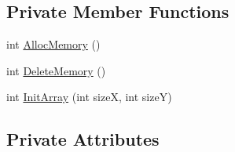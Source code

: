 \subsection*{Private Member Functions}
\begin{DoxyCompactItemize}
\item 
int \hyperlink{classCArray2d_ad7566b350c9840af12641ca9385aa352}{AllocMemory} ()
\item 
int \hyperlink{classCArray2d_a83f5fbefa605a6f1875d084f4f2a3600}{DeleteMemory} ()
\item 
int \hyperlink{classCArray2d_aa568ff144541b03023e1afc3c8fe9cba}{InitArray} (int sizeX, int sizeY)
\end{DoxyCompactItemize}
\subsection*{Private Attributes}

